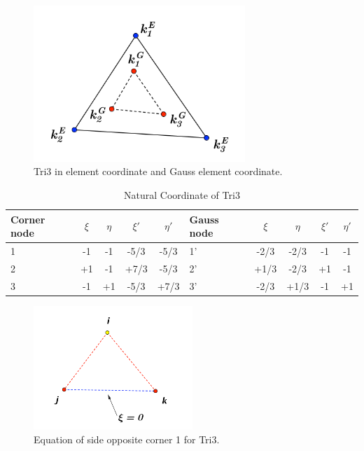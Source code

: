 \begin{figure}[h]
	\begin{center}
		\includegraphics[width=8cm,clip]{Tri3_1.pdf}			
		\caption{Tri3 in element coordinate and Gauss element coordinate.} \label{fig: Tri3_1}
	\end{center} 
\end{figure}

\begin{table}
	\centering
	\caption{Natural Coordinate of Tri3} \label{tab: Tri3}
	\begin{tabular}{p{1cm}ccccp{1cm}cccc}	
		
		\hline
		Corner node\centering& $\xi$& $\eta$& $\xi'$& $\eta'$& Gauss node\centering& $\xi$& $\eta$& $\xi'$& $\eta'$ \\
		\hline
		1\centering& -1& -1& -5/3& -5/3& 1'\centering& -2/3& -2/3& -1& -1 \\
		2\centering& +1& -1& +7/3& -5/3& 2'\centering&+1/3 & -2/3& +1& -1 \\
		3\centering& -1& +1& -5/3& +7/3& 3'\centering& -2/3& +1/3& -1& +1\\
		\hline
		
	\end{tabular}
\end{table}			

\begin{figure}[h]
	\begin{center}
		\includegraphics[width=6cm,clip]{Tri3_2.pdf}			
		\caption{Equation of side opposite corner 1 for Tri3.} \label{fig: Tri3_2}
	\end{center} 
\end{figure}

